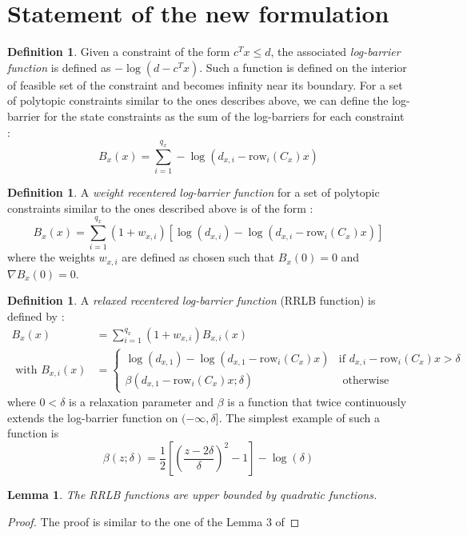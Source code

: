 \documentclass[12pt]{article}
\newtheorem{lemma}[theorem]{Lemma}
\theoremstyle{definition}
\newtheorem{definition}[theorem]{Definition}
\theoremstyle{remark}
\begin{document}
\section{Statement of the new formulation}
\begin{definition}
	Given a constraint of the form $c^Tx\leq d$, the associated \textit{log-barrier function} is defined as $-\log(d-c^Tx)$.
	Such a function is defined on the interior of feasible set of the constraint and becomes infinity near its boundary.
	For a set of polytopic constraints similar to the ones describes above, we can define the log-barrier for the state constraints as the sum of the log-barriers for each constraint :
	$$B_x(x)=\sum_{i=1}^{q_x}-\log(d_{x,i}-\mathrm{row}_i(C_x)x)$$

\end{definition}
\begin{definition}
	A \textit{weight recentered log-barrier function} for a set of polytopic constraints similar to the ones described above is of the form :
	$$B_x(x)=\sum_{i=1}^{q_x}(1+w_{x,i})\left[\log(d_{x,i})-\log(d_{x,i}-\mathrm{row}_i(C_x)x)\right]$$
	where the weights $w_{x,i}$ are defined as chosen such that $B_x(0)=0$ and $\nabla B_x(0)=0$.
\end{definition}
\begin{definition}
	A \textit{relaxed recentered log-barrier function} (RRLB function) is defined by :
	\begin{align*}
		B_x(x)&=\sum_{i=1}^{q_x}(1+w_{x,i})B_{x,i}(x)\\
		\text{ with }B_{x,i}(x)&=\begin{cases}
			\log(d_{x,1})-\log(d_{x,1}-\mathrm{row}_i(C_x)x)&\text{if }d_{x,i}-\mathrm{row}_i(C_x)x>\delta\\
			\beta(d_{x,1}-\mathrm{row}_i(C_x)x;\delta)&\text{ otherwise}
		\end{cases}
	\end{align*}
	where $0<\delta$ is a relaxation parameter and $\beta$ is a function that twice continuously extends the log-barrier function on $(-\infty,\delta]$.
	The simplest example of such a function is 
	$$\beta(z;\delta)=\frac{1}{2}\left[ \left( \frac{z-2\delta}{\delta} \right)^2-1 \right]-\log(\delta)$$
\end{definition}

\begin{lemma}
	\label{RRLB-quadratic-bound}
	The RRLB functions are upper bounded by quadratic functions.
\end{lemma}
\begin{proof}
	The proof is similar to the one of the Lemma 3 of %
\end{proof}
\end{document}
